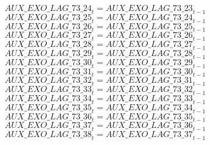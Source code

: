 \begin{dmath}
{AUX\_EXO\_LAG\_73\_24}_{t}={AUX\_EXO\_LAG\_73\_23}_{t-1}
\end{dmath}
\begin{dmath}
{AUX\_EXO\_LAG\_73\_25}_{t}={AUX\_EXO\_LAG\_73\_24}_{t-1}
\end{dmath}
\begin{dmath}
{AUX\_EXO\_LAG\_73\_26}_{t}={AUX\_EXO\_LAG\_73\_25}_{t-1}
\end{dmath}
\begin{dmath}
{AUX\_EXO\_LAG\_73\_27}_{t}={AUX\_EXO\_LAG\_73\_26}_{t-1}
\end{dmath}
\begin{dmath}
{AUX\_EXO\_LAG\_73\_28}_{t}={AUX\_EXO\_LAG\_73\_27}_{t-1}
\end{dmath}
\begin{dmath}
{AUX\_EXO\_LAG\_73\_29}_{t}={AUX\_EXO\_LAG\_73\_28}_{t-1}
\end{dmath}
\begin{dmath}
{AUX\_EXO\_LAG\_73\_30}_{t}={AUX\_EXO\_LAG\_73\_29}_{t-1}
\end{dmath}
\begin{dmath}
{AUX\_EXO\_LAG\_73\_31}_{t}={AUX\_EXO\_LAG\_73\_30}_{t-1}
\end{dmath}
\begin{dmath}
{AUX\_EXO\_LAG\_73\_32}_{t}={AUX\_EXO\_LAG\_73\_31}_{t-1}
\end{dmath}
\begin{dmath}
{AUX\_EXO\_LAG\_73\_33}_{t}={AUX\_EXO\_LAG\_73\_32}_{t-1}
\end{dmath}
\begin{dmath}
{AUX\_EXO\_LAG\_73\_34}_{t}={AUX\_EXO\_LAG\_73\_33}_{t-1}
\end{dmath}
\begin{dmath}
{AUX\_EXO\_LAG\_73\_35}_{t}={AUX\_EXO\_LAG\_73\_34}_{t-1}
\end{dmath}
\begin{dmath}
{AUX\_EXO\_LAG\_73\_36}_{t}={AUX\_EXO\_LAG\_73\_35}_{t-1}
\end{dmath}
\begin{dmath}
{AUX\_EXO\_LAG\_73\_37}_{t}={AUX\_EXO\_LAG\_73\_36}_{t-1}
\end{dmath}
\begin{dmath}
{AUX\_EXO\_LAG\_73\_38}_{t}={AUX\_EXO\_LAG\_73\_37}_{t-1}
\end{dmath}
